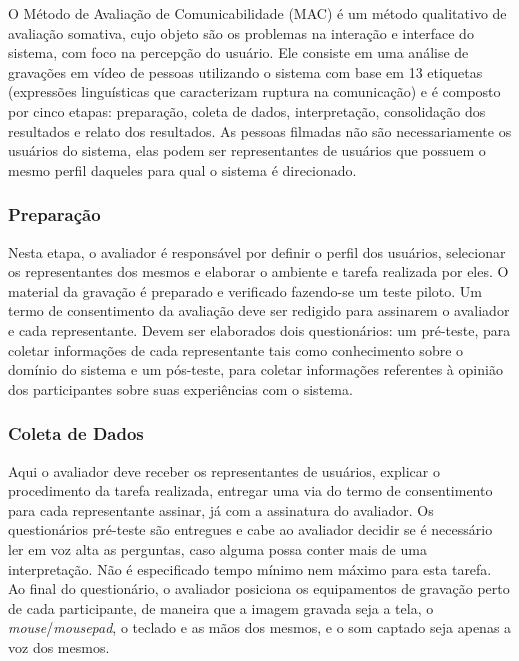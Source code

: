 \indent O Método de Avaliação de Comunicabilidade (MAC) é um método qualitativo de avaliação somativa, cujo objeto são os problemas na interação e interface do sistema, com foco na percepção do usuário. Ele consiste em uma análise de gravações em vídeo de pessoas utilizando o sistema com base em 13 etiquetas (expressões linguísticas que caracterizam ruptura na comunicação) e é composto por cinco etapas\cite{IHCbook}: preparação, coleta de dados, interpretação, consolidação dos resultados e relato dos resultados. As pessoas filmadas não são necessariamente os usuários do sistema, elas podem ser representantes de usuários que possuem o mesmo perfil daqueles para qual o sistema é direcionado. 

\subsubsection{Preparação}

\indent Nesta etapa, o avaliador é responsável por definir o perfil dos usuários, selecionar os representantes dos mesmos e elaborar o ambiente e tarefa realizada por eles. O material da gravação é preparado e verificado fazendo-se um teste piloto. Um termo de consentimento da avaliação deve ser redigido para assinarem o avaliador e cada representante. Devem ser elaborados dois questionários: um pré-teste, para coletar informações de cada representante tais como conhecimento sobre o domínio do sistema e um pós-teste, para coletar informações referentes à opinião dos participantes sobre suas experiências com o sistema.

\subsubsection{Coleta de Dados}

\indent Aqui o avaliador deve receber os representantes de usuários, explicar o procedimento da tarefa realizada, entregar uma via do termo de consentimento para cada representante assinar, já com a assinatura do avaliador. Os questionários pré-teste são entregues e cabe ao avaliador decidir se é necessário ler em voz alta as perguntas, caso alguma possa conter mais de uma interpretação. Não é especificado tempo mínimo nem máximo para esta tarefa. Ao final do questionário, o avaliador posiciona os equipamentos de gravação perto de cada participante, de maneira que a imagem gravada seja a tela, o \textit{mouse}/\textit{mousepad}, o teclado e as mãos dos mesmos, e o som captado seja apenas a voz dos mesmos. 


